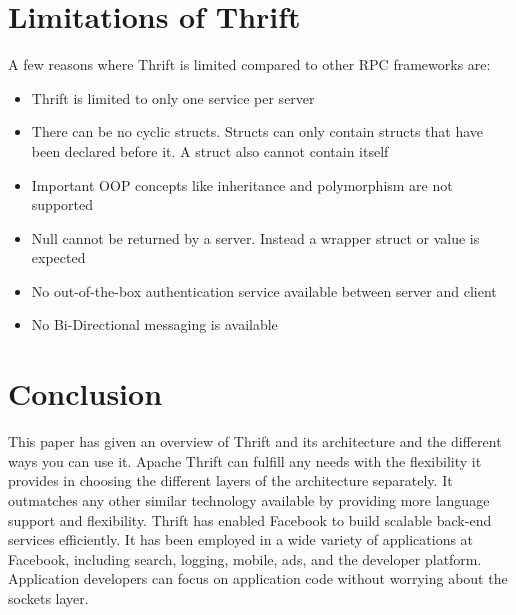 \documentclass[9pt,twocolumn,twoside]{../../styles/osajnl}
\begin{document}
\section{Limitations of Thrift}
A few reasons where Thrift is limited compared to other RPC frameworks are:
\begin{itemize}
\item Thrift \cite{pdf-thrift-tutorial} is limited to only one service per server
\item There can be no cyclic structs. Structs can only contain structs that have been declared before it. A struct also cannot contain itself
\item Important OOP concepts like inheritance and polymorphism are not supported
\item Null cannot be returned by a server. Instead a wrapper struct or value is expected
\item No out-of-the-box authentication service available between server and client
\item No Bi-Directional messaging is available\\
\end{itemize}


\section{Conclusion}
This paper has given an overview of Thrift \cite{pdf-thrift-tutorial} and its architecture and the different ways you can use it. Apache Thrift can fulfill any needs with the flexibility it provides in choosing the different layers of the architecture separately. It outmatches any other similar technology available by providing more language support and flexibility. Thrift has enabled Facebook to build scalable back-end services efficiently. It has been employed in a wide variety of applications at Facebook, including search, logging, mobile, ads, and the developer platform. Application developers can focus on application code without worrying about the sockets layer.


\end{document}

